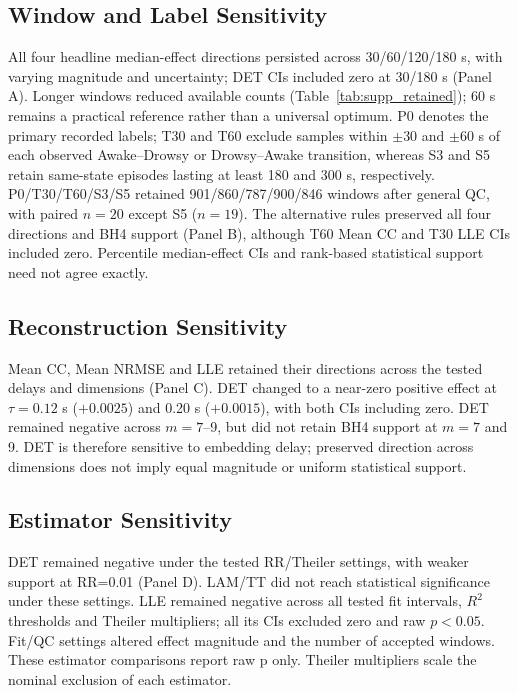 \documentclass[conference,a4paper]{IEEEtran}
\begin{document}
\subsection{Window and Label Sensitivity}\label{sec:supp_6_1}
All four headline median-effect directions persisted across 30/60/120/180 s, with varying magnitude and uncertainty; DET CIs included zero at 30/180 s (Panel A). Longer windows reduced available counts (Table~\ref{tab:supp_retained}); 60 s remains a practical reference rather than a universal optimum. P0 denotes the primary recorded labels; T30 and T60 exclude samples within $\pm30$ and $\pm60$ s of each observed Awake--Drowsy or Drowsy--Awake transition, whereas S3 and S5 retain same-state episodes lasting at least 180 and 300 s, respectively. P0/T30/T60/S3/S5 retained 901/860/787/900/846 windows after general QC, with paired $n=20$ except S5 ($n=19$). The alternative rules preserved all four directions and BH4 support (Panel B), although T60 Mean CC and T30 LLE CIs included zero. Percentile median-effect CIs and rank-based statistical support need not agree exactly.

\subsection{Reconstruction Sensitivity}\label{sec:supp_6_2}
Mean CC, Mean NRMSE and LLE retained their directions across the tested delays and dimensions (Panel C). DET changed to a near-zero positive effect at $\tau=0.12$ s ($+0.0025$) and 0.20 s ($+0.0015$), with both CIs including zero. DET remained negative across $m=7$--9, but did not retain BH4 support at $m=7$ and 9. DET is therefore sensitive to embedding delay; preserved direction across dimensions does not imply equal magnitude or uniform statistical support.

\subsection{Estimator Sensitivity}\label{sec:supp_6_3}
DET remained negative under the tested RR/Theiler settings, with weaker support at RR=0.01 (Panel D). LAM/TT did not reach statistical significance under these settings. LLE remained negative across all tested fit intervals, $R^2$ thresholds and Theiler multipliers; all its CIs excluded zero and raw $p<0.05$. Fit/QC settings altered effect magnitude and the number of accepted windows. These estimator comparisons report raw p only. Theiler multipliers scale the nominal exclusion of each estimator.
\end{document}
